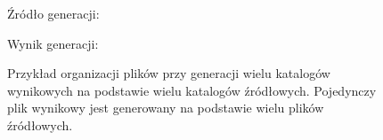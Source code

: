 \begin{figure}[!ht]
Źródło generacji:


Wynik generacji:


\caption{Przykład organizacji plików przy generacji wielu katalogów wynikowych na podstawie wielu katalogów źródłowych. Pojedynczy plik wynikowy jest generowany na podstawie wielu plików źródłowych.}
\label{fig:implementation_core:multipleFolders_multipleInputFiles}
\end{figure}
